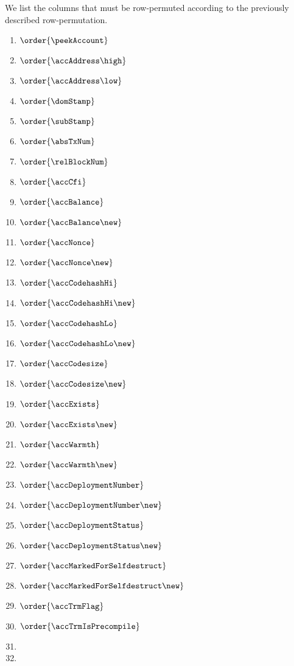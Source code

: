 We list the columns that must be row-permuted according to the previously described row-permutation.
\begin{multicols}{3}
	\begin{enumerate}
		\item $\order{\peekAccount}$
		\item $\order{\accAddress\high}$
		\item $\order{\accAddress\low}$
		\item $\order{\domStamp}$
		\item $\order{\subStamp}$
		\item $\order{\absTxNum}$
		\item $\order{\relBlockNum}$
		\item $\order{\accCfi}$
		\item $\order{\accBalance}$
		\item $\order{\accBalance\new}$
		\item $\order{\accNonce}$
		\item $\order{\accNonce\new}$
		\item $\order{\accCodehashHi}$
		\item $\order{\accCodehashHi\new}$
		\item $\order{\accCodehashLo}$
		\item $\order{\accCodehashLo\new}$
		\item $\order{\accCodesize}$
		\item $\order{\accCodesize\new}$
		\item $\order{\accExists}$
		\item $\order{\accExists\new}$
		\item $\order{\accWarmth}$
		\item $\order{\accWarmth\new}$
		\item $\order{\accDeploymentNumber}$
		\item $\order{\accDeploymentNumber\new}$
		\item $\order{\accDeploymentStatus}$
		\item $\order{\accDeploymentStatus\new}$
		\item $\order{\accMarkedForSelfdestruct}$
		\item $\order{\accMarkedForSelfdestruct\new}$
		\item $\order{\accTrmFlag}$
		\item $\order{\accTrmIsPrecompile}$
		\item[\vspace{\fill}]
		\item[\vspace{\fill}]
	\end{enumerate}
\end{multicols}
